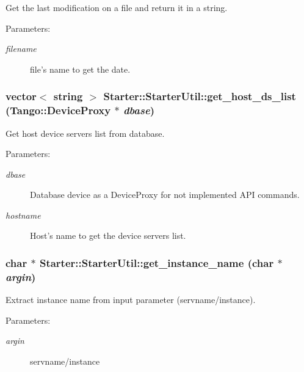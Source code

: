 Get the last modification on a file and return it in a string.

\begin{Desc}
\item[Parameters: ]\par
\begin{description}
\item[{\em 
filename}]file's name to get the date. \end{description}
\end{Desc}
\subsubsection{\setlength{\rightskip}{0pt plus 5cm}vector$<$ string $>$ Starter::Starter\-Util::get\_\-host\_\-ds\_\-list (Tango::Device\-Proxy $\ast$ {\em dbase})}\label{classStarter_1_1StarterUtil_z8_7}


Get host device servers list from database.

\begin{Desc}
\item[Parameters: ]\par
\begin{description}
\item[{\em 
dbase}]Database device as a Device\-Proxy for not implemented API commands. \item[{\em 
hostname}]Host's name to get the device servers list. \end{description}
\end{Desc}
\subsubsection{\setlength{\rightskip}{0pt plus 5cm}char $\ast$ Starter::Starter\-Util::get\_\-instance\_\-name (char $\ast$ {\em argin})}\label{classStarter_1_1StarterUtil_z8_1}


Extract instance name from input parameter (servname/instance).

\begin{Desc}
\item[Parameters: ]\par
\begin{description}
\item[{\em 
argin}]servname/instance \end{description}
\end{Desc}
